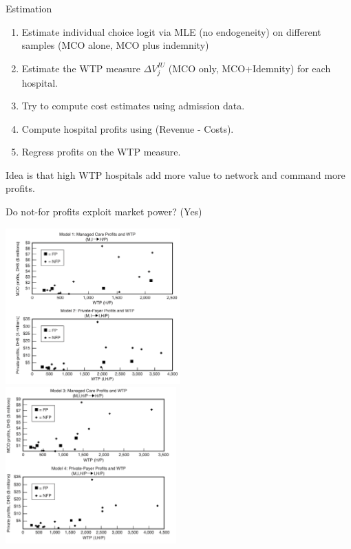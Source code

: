 \documentclass[xcolor=pdftex,dvipsnames,table,mathserif,aspectratio=169]{beamer}
\begin{document}
\begin{frame}{Estimation}
\begin{enumerate}
\item Estimate individual choice logit via MLE (no endogeneity) on different samples (MCO alone, MCO plus indemnity)
\item Estimate the WTP measure $\Delta V_j^{IU}$ (MCO only, MCO+Idemnity) for each hospital.
\item Try to compute cost estimates using admission data.
\item Compute hospital profits using (Revenue - Costs).
\item Regress profits on the WTP measure.
\end{enumerate}
Idea is that high WTP hospitals add more value to network and command more profits.
\end{frame}

\begin{frame}{Do not-for profits exploit market power? (Yes)}
\begin{center}
\includegraphics[height=6cm]{./resources/cds_fig1a.png}
\includegraphics[height=6cm]{./resources/cds_fig1b.png}
\end{center}
\end{frame}
\end{document}

